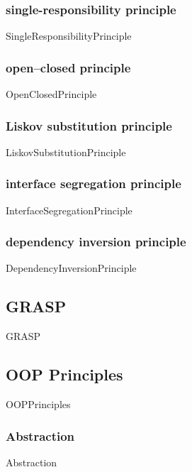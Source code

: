 \documentclass{article}
\begin{document}
        \subsubsection{single-responsibility principle}
            {SingleResponsibilityPrinciple}
        
        \subsubsection{open–closed principle}
            {OpenClosedPrinciple}
        
        \subsubsection{Liskov substitution principle}
            {LiskovSubstitutionPrinciple}
        
        \subsubsection{interface segregation principle}
            {InterfaceSegregationPrinciple}
        
        \subsubsection{dependency inversion principle}
            {DependencyInversionPrinciple}

    \subsection{GRASP}
        {GRASP}

    \subsection{OOP Principles}
        {OOPPrinciples}

        \subsubsection{Abstraction}
            {Abstraction}
\end{document}
